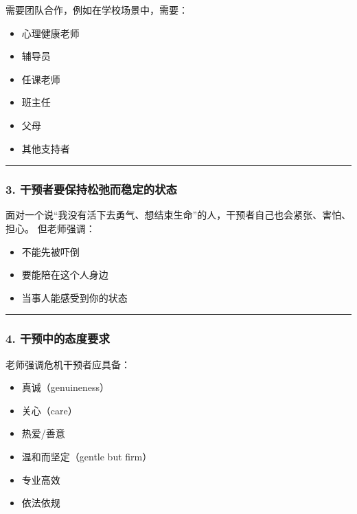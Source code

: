 \documentclass[
  chinese,
  9pt,
  a4paper,
]{ctexart}
\providecommand{\tightlist}{%
  \setlength{\itemsep}{0pt}\setlength{\parskip}{0pt}}
\begin{document}
需要团队合作，例如在学校场景中，需要：

\begin{itemize}
\tightlist
\item
  心理健康老师
\item
  辅导员
\item
  任课老师
\item
  班主任
\item
  父母
\item
  其他支持者
\end{itemize}

\begin{center}\rule{0.5\linewidth}{0.5pt}\end{center}

\subsubsection{3.
干预者要保持松弛而稳定的状态}\label{ux5e72ux9884ux8005ux8981ux4fddux6301ux677eux5f1bux800cux7a33ux5b9aux7684ux72b6ux6001}

面对一个说``我没有活下去勇气、想结束生命''的人，干预者自己也会紧张、害怕、担心。
但老师强调：

\begin{itemize}
\tightlist
\item
  不能先被吓倒
\item
  要能陪在这个人身边
\item
  当事人能感受到你的状态
\end{itemize}

\begin{center}\rule{0.5\linewidth}{0.5pt}\end{center}

\subsubsection{4.
干预中的态度要求}\label{ux5e72ux9884ux4e2dux7684ux6001ux5ea6ux8981ux6c42}

老师强调危机干预者应具备：

\begin{itemize}
\tightlist
\item
  真诚（genuineness）
\item
  关心（care）
\item
  热爱/善意
\item
  温和而坚定（gentle but firm）
\item
  专业高效
\item
  依法依规
\end{itemize}
\end{document}
